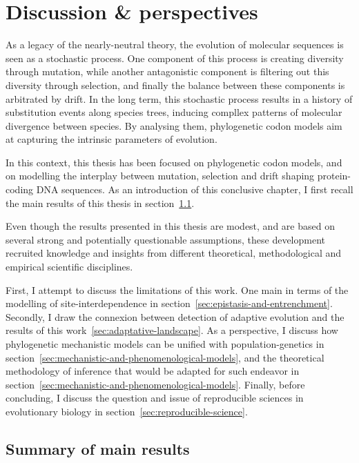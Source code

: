\chapter{Discussion \& perspectives}
\label{ch:discussion-perspectives}
{\hypersetup{linkcolor=GREYDARK}\minitoc}

As a legacy of the nearly-neutral theory, the evolution of molecular sequences is seen as a stochastic process.
One component of this process is creating diversity through mutation, while another antagonistic component is filtering out this diversity through selection, and finally the balance between these components is arbitrated by drift.
In the long term, this stochastic process results in a history of substitution events along species trees, inducing compllex patterns of molecular divergence between species.
By analysing them, phylogenetic codon models aim at capturing the intrinsic parameters of evolution.

In this context, this thesis has been focused on phylogenetic codon models, and on modelling the interplay between mutation, selection and drift shaping protein-coding DNA sequences.
As an introduction of this conclusive chapter, I first recall the main results of this thesis in section~\ref{sec:summary-of-main-results}.

Even though the results presented in this thesis are modest, and are based on several strong and potentially questionable assumptions, these development recruited knowledge and insights from different theoretical, methodological and empirical scientific disciplines.

First, I attempt to discuss the limitations of this work.
One main in terms of the modelling of site-interdependence in section~\ref{sec:epistasis-and-entrenchment}.
Secondly, I draw the connexion between detection of adaptive evolution and the results of this work~\ref{sec:adaptative-landscape}.
As a perspective, I discuss how phylogenetic mechanistic models can be unified with population-genetics in section~\ref{sec:mechanistic-and-phenomenological-models}, and the theoretical methodology of inference that would be adapted for such endeavor in section~\ref{sec:mechanistic-and-phenomenological-models}.
Finally, before concluding, I discuss the question and issue of reproducible sciences in evolutionary biology in section~\ref{sec:reproducible-science}.


\section{Summary of main results}
\label{sec:summary-of-main-results}

